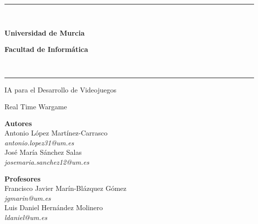 \documentclass[a4paper,10pt]{article}
\begin{document}
\begin{center}
\rule{100mm}{0.1mm} \\
\vspace{5mm}
\begin{Huge}
 \textbf{Universidad de Murcia}\\ \vspace{10mm}
\end{Huge}
\begin{huge}
 \textbf{Facultad de Informática}
\end{huge}
\vspace{5mm} \\
\rule{100mm}{0.5mm}

\vspace{20mm}

\begin{Huge}
 IA para el Desarrollo de Videojuegos \\ \vspace{5mm}
\end{Huge}

\begin{LARGE}
 Real Time Wargame
\end{LARGE}

\vspace{15mm}

\begin{Large}
 \textbf{Autores} \\ \vspace{2mm}
 Antonio López Martínez-Carrasco\\ \vspace{2mm}
 \textit{antonio.lopez31@um.es} \\ \vspace{4mm}
 José María Sánchez Salas\\ \vspace{2mm}
 \textit{josemaria.sanchez12@um.es}
\end{Large}

\vspace{7mm}

\begin{Large}
 \textbf{Profesores} \\ \vspace{2mm}
 Francisco Javier Marín-Blázquez Gómez \\ \vspace{2mm}
 \textit{jgmarin@um.es} \\ \vspace{4mm}
 Luis Daniel Hernández Molinero \\ \vspace{2mm}
 \textit{ldaniel@um.es}
\end{Large}
\end{center}
\newpage
\pagestyle{fancy}
\renewcommand{\headrulewidth}{0.5pt} %
\renewcommand{\footrulewidth}{0.5pt}
\tableofcontents
\newpage
\end{document}
